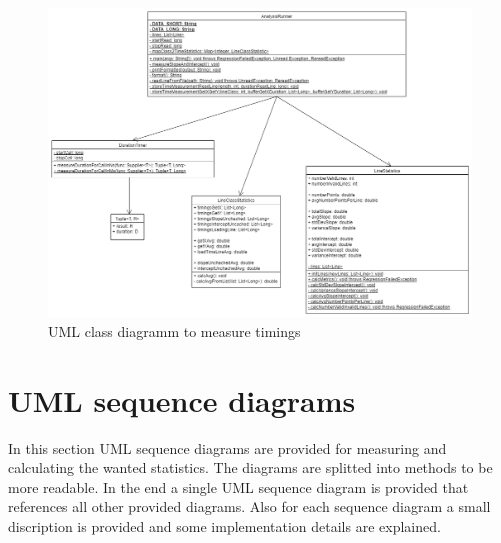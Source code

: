 \begin{landscape}
    \begin{figure}
        \begin{center}
            \includegraphics[width=1.60\textwidth]{img/classdiagram.png}
            \caption{UML class diagramm to measure timings}
        \end{center}
    \end{figure}
\end{landscape}

\section{UML sequence diagrams}
\label{sec:seq_diagrams}
In this section UML sequence diagrams are provided for measuring and calculating the wanted statistics. The diagrams are splitted into methods to be more readable. In the end a single UML sequence diagram is provided that references all other provided diagrams. Also for each sequence diagram a small discription is provided and some implementation details are explained.

